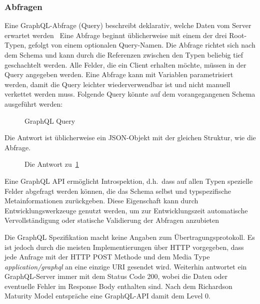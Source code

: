 \subsubsection{Abfragen}
Eine GraphQL-Abfrage (Query) beschreibt deklarativ, welche Daten vom Server erwartet werden~\cite[vgl.][]{GraphQL-spec-github}
Eine Abfrage beginnt üblicherweise mit einem der drei Root-Typen, gefolgt von einem optionalen Query-Namen.
Die Abfrage richtet sich nach dem Schema und kann durch die Referenzen zwischen den Typen beliebig tief geschachtelt werden.
Alle Felder, die ein Client erhalten möchte, müssen in der Query angegeben werden.
Eine Abfrage kann mit Variablen parametrisiert werden, damit die Query leichter wiederverwendbar ist und nicht manuell verkettet werden muss.
Folgende Query könnte auf dem vorangegangenen Schema ausgeführt werden:
\begin{figure}[h]
  \centering
  \caption{GraphQL Query}\label{img:graphql-query}
\end{figure}
\par
Die Antwort ist üblicherweise ein JSON-Objekt mit der gleichen Struktur, wie die Abfrage.
\begin{figure}[h]
  \centering
  \caption{Die Antwort zu~\ref{img:graphql-query}}\label{img:graphql-response}
\end{figure}
\par
Eine GraphQL API ermöglicht Introspektion, d.h.\ dass auf allen Typen spezielle Felder abgefragt werden können, die das Schema selbst und typspezifische Metainformationen zurückgeben.
Diese Eigenschaft kann durch Entwicklungswerkzeuge genutzt werden, um zur Entwicklungszeit automatische Vervollständigung oder statische Validierung der Abfragen anzubieten~\cite[vgl.][]{Postman-GraphQL}
\par
Die GraphQL Spezifikation macht keine Angaben zum Übertragungsprotokoll.
Es ist jedoch durch die meisten Implementierungen über HTTP vorgegeben, dass jede Anfrage mit der HTTP POST Methode und dem Media Type \emph{application/graphql} an eine einzige URI gesendet wird.
Weiterhin antwortet ein GraphQL-Server immer mit dem Status Code 200, wobei die Daten oder eventuelle Fehler im Response Body enthalten sind.
Nach dem Richardson Maturity Model entspräche eine GraphQL-API damit dem Level 0.

